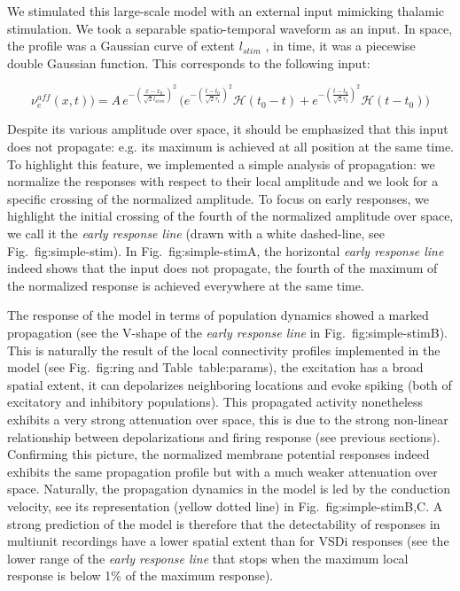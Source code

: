 \documentclass[8pt, colorlinks, a4paper]{article}
\renewcommand\ref{}
\newcommand{\corr}[1]{{#1}}
\begin{document}
\corr{We stimulated this large-scale model with an external input
  mimicking thalamic stimulation. We took a separable spatio-temporal
  waveform as an input. In space, the profile was a Gaussian curve of
  extent \(l_{stim}\) , in time, it was a piecewise double Gaussian
  function. This corresponds to the following input:}


\begin{equation}
\label{eq:ring-input}
\nu_e^{aff}(x,t)) = A \, e^{-(\frac{x-x_0}{\sqrt{2} l_{stim}})^2}
\, \Big(
e^{-(\frac{t-t_0}{\sqrt{2} \tau_1})^2} \mathcal{H}(t_0-t)+
e^{-(\frac{t-t_0}{\sqrt{2} \tau_2})^2} \mathcal{H}(t-t_0)
\Big)
\end{equation}

\corr{Despite its various amplitude over space, it should be
  emphasized that this input does not propagate: e.g. its maximum is
  achieved at all position at the same time. To highlight this
  feature, we implemented a simple analysis of propagation: we
  normalize the responses with respect to their local amplitude and we
  look for a specific crossing of the normalized amplitude. To focus
  on early responses, we highlight the initial crossing of the fourth
  of the normalized amplitude over space, we call it the \emph{early
    response line} (drawn with a white dashed-line, see
  Fig.~\ref{fig:simple-stim}). In Fig.~\ref{fig:simple-stim}A, the
  horizontal \emph{early response line} indeed shows that the input
  does not propagate, the fourth of the maximum of the normalized
  response is achieved everywhere at the same time.}

\corr{The response of the model in terms of population dynamics showed
  a marked propagation (see the V-shape of the \emph{early response
    line} in Fig.~\ref{fig:simple-stim}B). This is naturally the
  result of the local connectivity profiles implemented in the model
  (see Fig.~\ref{fig:ring} and Table~\ref{table:params}), the
  excitation has a broad spatial extent, it can depolarizes
  neighboring locations and evoke spiking (both of excitatory and
  inhibitory populations). This propagated activity nonetheless
  exhibits a very strong attenuation over space, this is due to the
  strong non-linear relationship between depolarizations and firing
  response (see previous sections). Confirming this picture, the
  normalized membrane potential responses indeed exhibits the same
  propagation profile but with a much weaker attenuation over space.
  Naturally, the propagation dynamics in the model is led by the
  conduction velocity, see its representation (yellow dotted line) in
  Fig.~\ref{fig:simple-stim}B,C. A strong prediction of the model is
  therefore that the detectability of responses in multiunit
  recordings have a lower spatial extent than for VSDi responses (see
  the lower range of the \emph{early response line} that stops when
  the maximum local response is below 1\% of the maximum response).}
\end{document}
